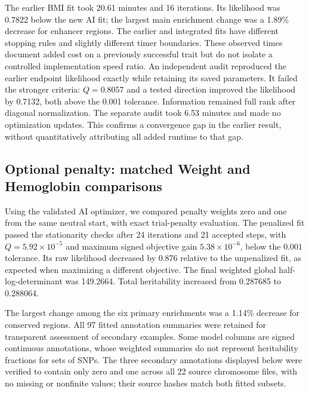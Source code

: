 \documentclass[11pt]{article}
\begin{document}
The earlier BMI fit took 20.61 minutes and 16 iterations. Its likelihood was 0.7822 below the new AI fit; the largest main enrichment change was a 1.89\% decrease for enhancer regions. The earlier and integrated fits have different stopping rules and slightly different timer boundaries. These observed times document added cost on a previously successful trait but do not isolate a controlled implementation speed ratio. An independent audit reproduced the earlier endpoint likelihood exactly while retaining its saved parameters. It failed the stronger criteria: $Q=0.8057$ and a tested direction improved the likelihood by 0.7132, both above the 0.001 tolerance. Information remained full rank after diagonal normalization. The separate audit took 6.53 minutes and made no optimization updates. This confirms a convergence gap in the earlier result, without quantitatively attributing all added runtime to that gap.

\subsection{Optional penalty: matched Weight and Hemoglobin comparisons}
Using the validated AI optimizer, we compared penalty weights zero and one from the same neutral start, with exact trial-penalty evaluation. The penalized fit passed the stationarity checks after 24 iterations and 21 accepted steps, with $Q=5.92\times10^{-5}$ and maximum signed objective gain $5.38\times10^{-6}$, below the $0.001$ tolerance. Its raw likelihood decreased by 0.876 relative to the unpenalized fit, as expected when maximizing a different objective. The final weighted global half-log-determinant was 149.2664. Total heritability increased from 0.287685 to 0.288064.

\begin{table}[H]
\centering\small

\caption{Effect of the optional information penalty on the six main marginal enrichment estimates for Weight, using the same safeguarded AI implementation. Both fits passed the accurate penalized or unpenalized stationarity checks. Changes are relative to the penalty-off estimate. Uncertainty calibration is not evaluated.}
\label{tab:penaltyweight}
\end{table}

The largest change among the six primary enrichments was a 1.14\% decrease for conserved regions. All 97 fitted annotation summaries were retained for transparent assessment of secondary examples. Some model columns are signed continuous annotations, whose weighted summaries do not represent heritability fractions for sets of SNPs. The three secondary annotations displayed below were verified to contain only zero and one across all 22 source chromosome files, with no missing or nonfinite values; their source hashes match both fitted subsets.
\end{document}

